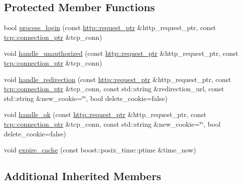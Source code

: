 \subsection*{Protected Member Functions}
\begin{DoxyCompactItemize}
\item 
bool \hyperlink{classpion_1_1http_1_1cookie__auth_af6d045c98979589448f837899fd62a9e}{process\-\_\-login} (const \hyperlink{namespacepion_1_1http_ace432b70a9459d50ff4969a7a47f0ccb}{http\-::request\-\_\-ptr} \&http\-\_\-request\-\_\-ptr, const \hyperlink{namespacepion_1_1tcp_a6c9b7497068009f6d81d95ec0b0627d6}{tcp\-::connection\-\_\-ptr} \&tcp\-\_\-conn)
\item 
void \hyperlink{classpion_1_1http_1_1cookie__auth_ae0280cc2c80137330c8c85d7a085325f}{handle\-\_\-unauthorized} (const \hyperlink{namespacepion_1_1http_ace432b70a9459d50ff4969a7a47f0ccb}{http\-::request\-\_\-ptr} \&http\-\_\-request\-\_\-ptr, const \hyperlink{namespacepion_1_1tcp_a6c9b7497068009f6d81d95ec0b0627d6}{tcp\-::connection\-\_\-ptr} \&tcp\-\_\-conn)
\item 
void \hyperlink{classpion_1_1http_1_1cookie__auth_ac8bc179f19dfd34567e1bc45d1c0b7cb}{handle\-\_\-redirection} (const \hyperlink{namespacepion_1_1http_ace432b70a9459d50ff4969a7a47f0ccb}{http\-::request\-\_\-ptr} \&http\-\_\-request\-\_\-ptr, const \hyperlink{namespacepion_1_1tcp_a6c9b7497068009f6d81d95ec0b0627d6}{tcp\-::connection\-\_\-ptr} \&tcp\-\_\-conn, const std\-::string \&redirection\-\_\-url, const std\-::string \&new\-\_\-cookie=\char`\"{}\char`\"{}, bool delete\-\_\-cookie=false)
\item 
void \hyperlink{classpion_1_1http_1_1cookie__auth_a5cd041c1fa661644fb29f98d4a5f4354}{handle\-\_\-ok} (const \hyperlink{namespacepion_1_1http_ace432b70a9459d50ff4969a7a47f0ccb}{http\-::request\-\_\-ptr} \&http\-\_\-request\-\_\-ptr, const \hyperlink{namespacepion_1_1tcp_a6c9b7497068009f6d81d95ec0b0627d6}{tcp\-::connection\-\_\-ptr} \&tcp\-\_\-conn, const std\-::string \&new\-\_\-cookie=\char`\"{}\char`\"{}, bool delete\-\_\-cookie=false)
\item 
void \hyperlink{classpion_1_1http_1_1cookie__auth_a2ed6fd5500e68795955aedd6570328f4}{expire\-\_\-cache} (const boost\-::posix\-\_\-time\-::ptime \&time\-\_\-now)
\end{DoxyCompactItemize}
\subsection*{Additional Inherited Members}


